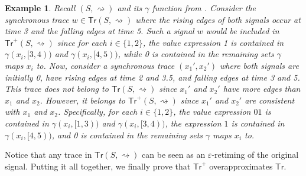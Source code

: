 \documentclass[iicol,lineno]{sn-jnl}
\renewcommand{\cref}{\Cref}
\newcommand{\hb}{\rightsquigarrow}
\newcommand{\tr}{\mathsf{Tr}}
\newcommand{\?}{\text{?}}
\newtheorem{example}{Example}
\begin{document}
	
	\begin{example} \label{ex:overapx}
		Recall \((S, {\hb})\) and its \(\gamma\) function from \cref{fig:csve}.
		Consider the synchronous trace \(w \in \tr(S, {\hb})\) where the rising edges of both signals occur at time 3 and the falling edges at time 5.
		Such a signal \( w \) would be included in \(\tr^+(S,{\hb})\) since for each \(i \in \{1,2\}\), the value expression 1 is contained in \(\gamma(x_i, [3,4))\) and \(\gamma(x_i, [4,5))\), while 0 is contained in the remaining sets \(\gamma\) maps \(x_i\) to.
		Now, consider a synchronous trace \((x_1', x_2')\) where both signals are initially 0, have rising edges at time 2 and 3.5, and falling edges at time 3 and 5.
		This trace does not belong to \(\tr(S, {\hb})\) since \(x_1'\) and \(x_2'\) have more edges than \(x_1\) and \(x_2\).
		However, it belongs to \(\tr^+(S,{\hb})\) since \(x_1'\) and \(x_2'\) are consistent with \(x_1\) and \(x_2\).
		Specifically, for each \(i \in \{1,2\}\), the value expression \(01\) is contained in \(\gamma(x_i, [1,3))\) and \(\gamma(x_i, [3,4))\), the expression \(1\) is contained in \(\gamma(x_i, [4,5))\), and 0 is contained in the remaining sets \(\gamma\) maps \(x_i\) to.
	\end{example}
	
	Notice that any trace in $\tr(S,\hb)$ can be seen as an $\varepsilon$-retiming of the original signal.
	Putting it all together, we finally prove that $\tr^+$ overapproximates $\tr$.
	
\end{document}
